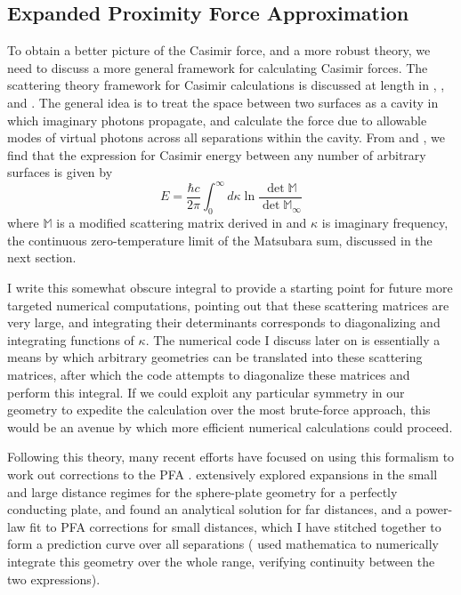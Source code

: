 \documentclass[11pt,traditabstract]{article}
\begin{document}
\subsection{Expanded Proximity Force Approximation}

To obtain a better picture of the Casimir force, and a more robust theory, we need to discuss a more general framework for calculating Casimir forces. The scattering theory framework for Casimir calculations is discussed at length in \citet{ScatteringTheory}, \citet{Emig07}, and \citet{Rahi}. The general idea is to treat the space between two surfaces as a cavity in which imaginary photons propagate, and calculate the force due to allowable modes of virtual photons across all separations within the cavity. From \citet{Rahi} and \citet{Emig07}, we find that the expression for Casimir energy between any number of arbitrary surfaces is given by
$$
E=\frac{\hbar c}{2\pi}\int_0^{\infty}d\kappa\ln\frac{\det{\mathbb{M}}}{\det{\mathbb{M}_{\infty}}}
$$
where $\mathbb{M}$ is a modified scattering matrix derived in \citet{Emig07} and $\kappa$ is imaginary frequency, the continuous zero-temperature limit of the Matsubara sum, discussed in the next section. 

I write this somewhat obscure integral to provide a starting point for future more targeted numerical computations, pointing out that these scattering matrices are very large, and integrating their determinants corresponds to diagonalizing and integrating functions of $\kappa$. The numerical code I discuss later on is essentially a means by which arbitrary geometries can be translated into these scattering matrices, after which the code attempts to diagonalize these matrices and perform this integral. If we could exploit any particular symmetry in our geometry to expedite the calculation over the most brute-force approach, this would be an avenue by which more efficient numerical calculations could proceed.

Following this theory, many recent efforts have focused on using this formalism to work out corrections to the PFA \citep[see e.g.][]{Dexp, Bimonte12, Bulgac, Durand}. \citet{Emig07} extensively explored expansions in the small and large distance regimes for the sphere-plate geometry for a perfectly conducting plate, and found an analytical solution for far distances, and a power-law fit to PFA corrections for small distances, which I have stitched together to form a prediction curve over all separations (\citet{Emig07} used mathematica to numerically integrate this geometry over the whole range, verifying continuity between the two expressions). 
\end{document}
